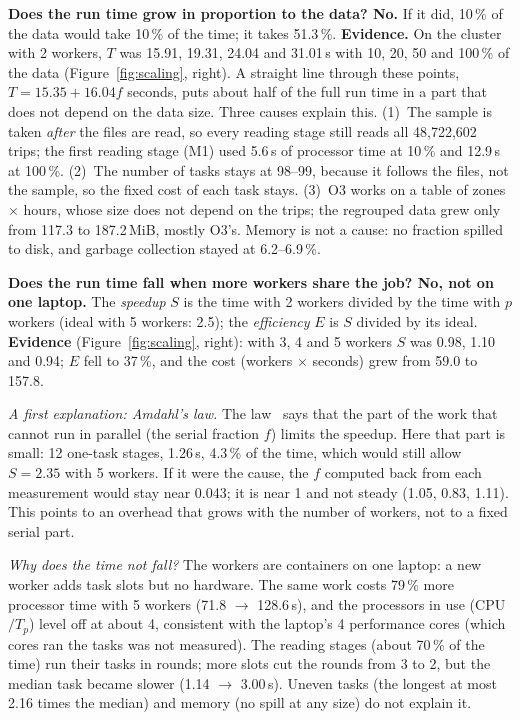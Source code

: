 \documentclass[sigconf]{acmart}
\newcommand{\mib}{\,MiB}
\newcommand{\s}{\,s}
\begin{document}
\textbf{Does the run time grow in proportion to the data? No.} If it did, 10\,\% of the data would take 10\,\% of the time; it
takes 51.3\,\%.
\textbf{Evidence.} On the cluster with 2 workers, $T$ was 15.91, 19.31, 24.04 and 31.01\s{}
with 10, 20, 50 and 100\,\% of the data (Figure~\ref{fig:scaling}, right). A straight line
through these points, $T = 15.35 + 16.04 f$ seconds, puts about half of the full run time in a
part that does not depend on the data size. Three causes explain this. (1)~The sample is taken \emph{after} the files are read, so every
reading stage still reads all 48,722,602 trips; the first reading stage (M1) used 5.6\s{} of
processor time at 10\,\% and 12.9\s{} at 100\,\%. (2)~The number of tasks stays at 98--99,
because it follows the files, not the sample, so the fixed cost of each task stays. (3)~O3 works
on a table of zones $\times$ hours, whose size does not depend on the trips; the regrouped data
grew only from 117.3 to 187.2\mib, mostly O3's. Memory is not a cause: no fraction spilled to
disk, and garbage collection stayed at 6.2--6.9\,\%.

\textbf{Does the run time fall when more workers share the job? No, not on one laptop.} The
\emph{speedup} $S$ is the time with 2 workers divided by the time with $p$ workers (ideal with 5
workers: 2.5); the \emph{efficiency} $E$ is $S$ divided by its ideal. \textbf{Evidence}
(Figure~\ref{fig:scaling}, right): with 3, 4 and 5 workers $S$ was 0.98, 1.10 and 0.94; $E$
fell to 37\,\%, and the cost (workers $\times$ seconds) grew from 59.0 to 157.8.

\emph{A first explanation: Amdahl's law.} The law~\cite{amdahl1967} says that the part of the
work that cannot run in parallel (the serial fraction $f$) limits the speedup. Here that part is
small: 12 one-task stages, 1.26\s, 4.3\,\% of the time, which would still allow $S = 2.35$ with
5 workers. If it were the cause, the $f$ computed back from each measurement would stay near
0.043; it is near 1 and not steady (1.05, 0.83, 1.11). This points to an overhead that grows
with the number of workers, not to a fixed serial part.

\emph{Why does the time not fall?} The workers are containers on one laptop: a new worker adds
task slots but no hardware. The same work costs 79\,\% more processor time with 5 workers
(71.8 $\to$ 128.6\s), and the processors in use (CPU$/T_p$) level off at about 4, consistent
with the laptop's 4 performance cores (which cores ran the tasks was not measured). The reading
stages (about 70\,\% of the time) run their tasks in rounds; more slots cut the rounds from 3 to
2, but the median task became slower (1.14 $\to$ 3.00\s). Uneven tasks (the longest at most
2.16 times the median) and memory (no spill at any size) do not explain it.
\end{document}
